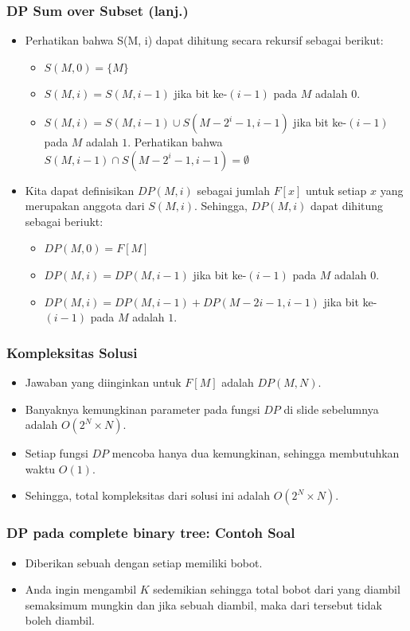 \begin{frame}
\frametitle{DP Sum over Subset (lanj.)}
\begin{itemize}
  \item Perhatikan bahwa S(M, i) dapat dihitung secara rekursif sebagai berikut:
  \begin{itemize}
    \item $S(M, 0) = \{M\}$
    \item $S(M, i) = S(M, i - 1)$ jika bit ke-$(i - 1)$ pada $M$ adalah $0$.
    \item $S(M, i) = S(M, i - 1) \cup S(M - 2^i - 1, i - 1)$ jika bit ke-$(i - 1)$ pada $M$ adalah $1$. Perhatikan bahwa $S(M, i - 1) \cap S(M - 2^i - 1, i - 1) = \emptyset$
  \end{itemize}
  \item Kita dapat definisikan $DP(M, i)$ sebagai jumlah $F[x]$ untuk setiap $x$ yang merupakan anggota dari $S(M, i)$. Sehingga, $DP(M, i)$ dapat dihitung sebagai beriukt:
  \begin{itemize}
    \item $DP(M, 0) = F[M]$
    \item $DP(M, i) = DP(M, i - 1)$ jika bit ke-$(i - 1)$ pada $M$ adalah $0$.
    \item $DP(M, i) = DP(M, i - 1) + DP(M - 2i - 1, i - 1)$ jika bit ke-$(i - 1)$ pada $M$ adalah $1$.
  \end{itemize}
\end{itemize}
\end{frame}

\begin{frame}
\frametitle{Kompleksitas Solusi}
\begin{itemize}
  \item Jawaban yang diinginkan untuk \fbitmask $F[M]$ adalah $DP(M, N)$.
  \item Banyaknya kemungkinan parameter pada fungsi $DP$ di slide sebelumnya adalah $O(2^N \times N)$.
  \item Setiap fungsi $DP$ mencoba hanya dua kemungkinan, sehingga membutuhkan waktu $O(1)$.
  \item Sehingga, total kompleksitas dari solusi \fdp ini adalah $O(2^N \times N)$.
\end{itemize}
\end{frame}

\begin{frame}
\frametitle{DP pada complete binary tree: Contoh Soal}
\begin{itemize}
  \item Diberikan sebuah \xspace dengan setiap \fnode memiliki bobot.
  \item Anda ingin mengambil $K$ \fnode sedemikian sehingga total bobot dari \fnode yang diambil semaksimum mungkin dan jika sebuah \fnode diambil, maka \fparent dari \fnode tersebut tidak boleh diambil.
\end{itemize}
\end{frame}

